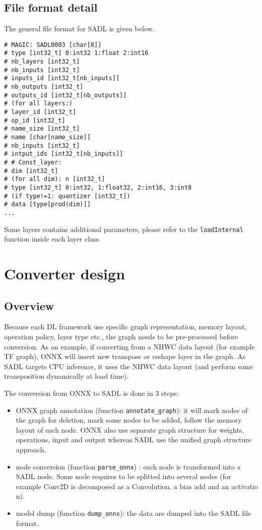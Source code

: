\documentclass[10pt,a4paper]{article}
\begin{document}
\subsection{File format detail}
The general file format for SADL is given below.
\begin{lstlisting}[caption={SADL format conversion},style=code]
# MAGIC: SADL0003 [char[8]] 
# type [int32_t] 0:int32 1:float 2:int16 
# nb_layers [int32_t] 
# nb_inputs [int32_t] 
# inputs_id [int32_t[nb_inputs]] 
# nb_outputs [int32_t] 
# outputs_id [int32_t[nb_outputs]] 
# (for all layers:) 
# layer_id [int32_t] 
# op_id [int32_t] 
# name_size [int32_t] 
# name [char[name_size]] 
# nb_inputs [int32_t] 
# intput_ids [int32_t[nb_inputs]] 
# # Const_layer: 
# dim [int32_t] 
# (for all dim): n [int32_t] 
# type [int32_t] 0:int32, 1:float32, 2:int16, 3:int8 
# (if type!=1: quantizer [int32_t]) 
# data [type[prod(dim)]] 
...
\end{lstlisting}
Some layers contains additional parameters, please refer to the \texttt{loadInternal} function inside each layer class.




\section{Converter design}
\subsection{Overview}
Because each DL framework use specific graph representation, memory layout, operation policy, layer type etc., the graph needs to be pre-processed before conversion. As an example, if converting from a NHWC data layout (for example TF graph), ONNX will insert new transpose or reshape layer in the graph.
As SADL targets CPU inference, it uses the NHWC data layout (and perform some transposition dynamically at load time).

The conversion from ONNX to SADL is done in 3 steps:
\begin{itemize}
\item ONNX graph annotation (function \texttt{annotate\_graph}): it will mark nodes of the graph for deletion, mark some nodes to be added, follow the memory layout of each node. ONNX also use separate graph structure for weights, operations, input and output whereas SADL use the unified graph structure approach.
\item node conversion (function \texttt{parse\_onnx}) : each node is transformed into a SADL node. Some node requires to be splitted into several nodes (for example Conv2D is decomposed as a Convolution, a bias add and an activatio n).
\item model dump (function \texttt{dump\_onnx}): the data are dumped into the SADL file format.
\end{itemize}
\end{document}

